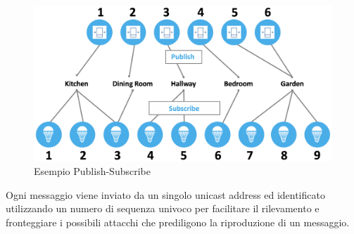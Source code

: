 \begin{figure}[!ht]
    \centering
    \includegraphics[width = \textwidth]{images/Publish_Subscribe_BLE.png}
    \caption{Esempio Publish-Subscribe}
    \label{fig:publish_subscribe_ble}
\end{figure}

\noindent Ogni messaggio viene inviato da un singolo unicast address ed identificato utilizzando un numero di sequenza univoco per facilitare il rilevamento e fronteggiare i possibili attacchi che prediligono la riproduzione di un messaggio.

